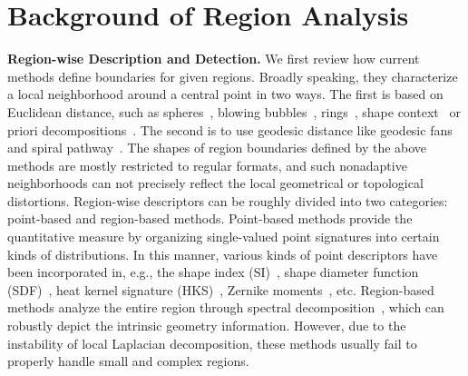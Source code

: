 \section{Background of Region Analysis}

\textbf{Region-wise Description and Detection.} We first review how
current methods define boundaries for given regions. Broadly speaking,
they characterize a local neighborhood around a central point in two
ways. The first is based on Euclidean distance, such
as spheres~\cite{Kazhdan:2003}, blowing bubbles~\cite{Mortara:03},
rings~\cite{Gatzke:2005}, shape context~\cite{Kokkinos:2012} or
priori decompositions~\cite{Gal2006,Itskovich2011}. The second is
to use geodesic distance like geodesic fans~\cite{Zelinka:2004} and
spiral pathway~\cite{Lavoue:2011}. The shapes of region boundaries
defined by the above methods are mostly restricted to regular formats,
and such nonadaptive neighborhoods can not precisely
reflect the local geometrical or topological
distortions. Region-wise descriptors can be roughly divided into two
categories: point-based and region-based methods.
Point-based methods provide the quantitative measure
by organizing single-valued point signatures into certain kinds of
distributions. In this manner, various kinds of point descriptors
have been incorporated in, e.g., the shape index
(SI)~\cite{Toldo:2009}, shape diameter function
(SDF)~\cite{Shapira:2010}, heat kernel signature
(HKS)~\cite{Bronstein:2013}, Zernike
moments~\cite{Maximo:2011:RRI:2027471}, etc. Region-based methods
analyze the entire region through spectral
decomposition~\cite{Hu2009,JiangZZ:13}, which can robustly depict the
intrinsic geometry information. However, due to the instability of
local Laplacian decomposition, these methods usually fail to properly
handle small and complex regions.


